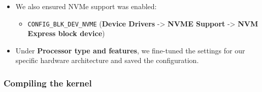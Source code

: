\begin{itemize}
  \begin{itemize}
  \item
    \texttt{CONFIG\_SCHED\_MC\_PRIO} (\textbf{Processor type and
    features} -\textgreater{} \textbf{Multi-core scheduler support})
  \item
    \texttt{CONFIG\_CPU\_FREQ} (\textbf{Power management and ACPI
    options} -\textgreater{} \textbf{CPU Frequency scaling})
  \item
    \texttt{CONFIG\_STACKPROTECTOR}
  \item
    \texttt{CONFIG\_APM}
  \item
    \texttt{CONFIG\_ACPI\_PROCESSOR} (\textbf{Power management and ACPI
    options} -\textgreater{} \textbf{ACPI (Advanced Configuration and
    Power Interface)})
  \item
    \texttt{CONFIG\_CPU\_IDLE} (\textbf{Power management and ACPI
    options} -\textgreater{} \textbf{CPU idle PM support})
  \item
    \textbf{Simultaneous Multi-threading} (if supported by the hardware)
  \end{itemize}
\item
  We also ensured NVMe support was enabled:

  \begin{itemize}
  \item
    \texttt{CONFIG\_BLK\_DEV\_NVME} (\textbf{Device Drivers}
    -\textgreater{} \textbf{NVME Support} -\textgreater{} \textbf{NVM
    Express block device})
  \end{itemize}
\item
  Under \textbf{Processor type and features}, we fine-tuned the settings
  for our specific hardware architecture and saved the configuration.
\end{itemize}

\subsubsection{Compiling the kernel}\label{compiling-the-kernel}

